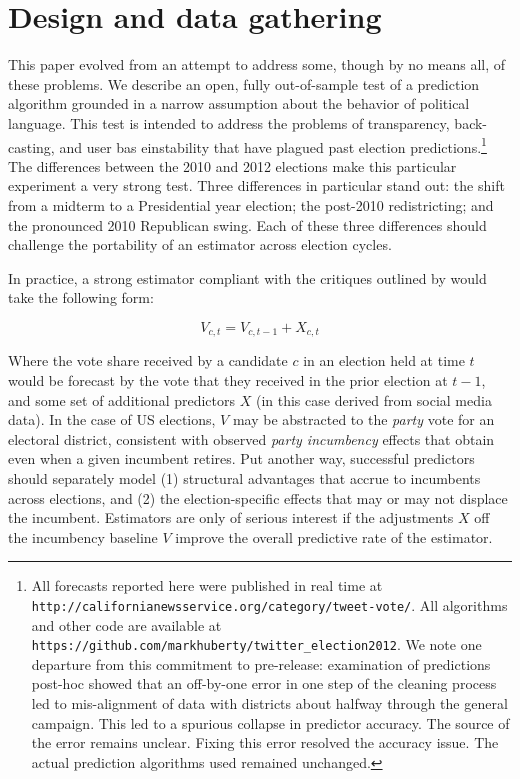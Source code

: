 \documentclass{acm_proc_article-sp}
\begin{document}

\section{Design and data gathering}
\label{sec:design-data-gath}

This paper evolved from an attempt to address some, though by no means
all, of these problems. We describe an open, fully out-of-sample test
of a prediction algorithm grounded in a narrow assumption about the
behavior of political language. This test is intended to address the
problems of transparency, back-casting, and user bas einstability that
have plagued past election predictions.\footnote{All forecasts reported here were published in
real time at \texttt{http://californianewsservice.org/category/tweet-vote/}.  All
algorithms and other code are available at
\texttt{https://github.com/markhuberty/twitter\_election2012}. We note one departure from this commitment to
  pre-release: examination of predictions post-hoc showed that an
  off-by-one error in one step of the cleaning process led to
  mis-alignment of data with districts about halfway through the general
  campaign. This led to a spurious collapse in predictor accuracy. The
  source of the error remains unclear. Fixing this error resolved the
  accuracy issue. The actual prediction algorithms used remained
  unchanged.} 
The differences between the 2010 and 2012 elections make this
particular experiment a very strong test. Three differences in
particular stand out: the shift from a midterm to a Presidential year
election; the post-2010 redistricting; and the pronounced 2010
Republican swing. Each of these three differences should challenge the
portability of an estimator across election cycles.

In practice, a strong estimator compliant with the critiques outlined
by \cite{metaxas2011not} would take the following form:

\begin{equation}
  \label{eq:1}
  V_{c,t} = V_{c,t - 1} + X_{c,t}
\end{equation}

Where the vote share received by a candidate $c$ in an election held
at time $t$ would be forecast by the vote that they received in the
prior election at $t-1$, and some set of additional predictors $X$ (in
this case derived from social media data). In the case of US
elections, $V$ may be abstracted to the \textit{party} vote for an
electoral district, consistent with observed \textit{party incumbency}
effects that obtain even when a given incumbent retires. Put another
way, successful predictors should separately model (1) structural
advantages that accrue to incumbents across elections, and (2) the
election-specific effects that may or may not displace the
incumbent. Estimators are only of serious interest if the adjustments
$X$ off the incumbency baseline $V$ improve the overall predictive
rate of the estimator. 
\end{document}
